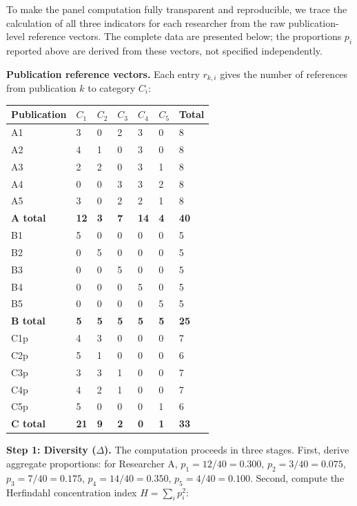\documentclass[
]{article}
\begin{document}
To make the panel computation fully transparent and reproducible, we
trace the calculation of all three indicators for each researcher from
the raw publication-level reference vectors. The complete data are
presented below; the proportions \(p_i\) reported above are derived from
these vectors, not specified independently.

\textbf{Publication reference vectors.} Each entry \(r_{k,i}\) gives the
number of references from publication \(k\) to category \(C_i\):

\begin{longtable}[]{@{}lllllll@{}}
\toprule
Publication & \(C_1\) & \(C_2\) & \(C_3\) & \(C_4\) & \(C_5\) & Total \\
\midrule
\endhead
A1 & 3 & 0 & 2 & 3 & 0 & 8 \\
A2 & 4 & 1 & 0 & 3 & 0 & 8 \\
A3 & 2 & 2 & 0 & 3 & 1 & 8 \\
A4 & 0 & 0 & 3 & 3 & 2 & 8 \\
A5 & 3 & 0 & 2 & 2 & 1 & 8 \\
\textbf{A total} & \textbf{12} & \textbf{3} & \textbf{7} & \textbf{14} &
\textbf{4} & \textbf{40} \\
B1 & 5 & 0 & 0 & 0 & 0 & 5 \\
B2 & 0 & 5 & 0 & 0 & 0 & 5 \\
B3 & 0 & 0 & 5 & 0 & 0 & 5 \\
B4 & 0 & 0 & 0 & 5 & 0 & 5 \\
B5 & 0 & 0 & 0 & 0 & 5 & 5 \\
\textbf{B total} & \textbf{5} & \textbf{5} & \textbf{5} & \textbf{5} &
\textbf{5} & \textbf{25} \\
C1p & 4 & 3 & 0 & 0 & 0 & 7 \\
C2p & 5 & 1 & 0 & 0 & 0 & 6 \\
C3p & 3 & 3 & 1 & 0 & 0 & 7 \\
C4p & 4 & 2 & 1 & 0 & 0 & 7 \\
C5p & 5 & 0 & 0 & 0 & 1 & 6 \\
\textbf{C total} & \textbf{21} & \textbf{9} & \textbf{2} & \textbf{0} &
\textbf{1} & \textbf{33} \\
\bottomrule
\end{longtable}

\textbf{Step 1: Diversity (\(\Delta\)).} The computation proceeds in
three stages. First, derive aggregate proportions: for Researcher A,
\(p_1 = 12/40 = 0.300\), \(p_2 = 3/40 = 0.075\), \(p_3 = 7/40 = 0.175\),
\(p_4 = 14/40 = 0.350\), \(p_5 = 4/40 = 0.100\). Second, compute the
Herfindahl concentration index \(H = \sum_i p_i^2\):
\end{document}
